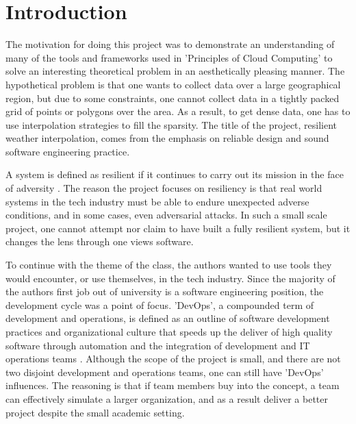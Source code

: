 \section{Introduction}
The motivation for doing this project was to demonstrate an understanding of many of the tools and frameworks used in 'Principles of Cloud Computing' to solve an interesting theoretical problem in an aesthetically pleasing manner.
The hypothetical problem is that one wants to collect data over a large geographical region,
but due to some constraints,
one cannot collect data in a tightly packed grid of points or polygons over the area.
As a result, to get dense data,
one has to use interpolation strategies to fill the sparsity.
The title of the project, resilient weather interpolation,
comes from the emphasis on reliable design and sound software engineering practice.

A system is defined as resilient if it continues to carry out its mission in the face of adversity \cite{systemResilience}.
The reason the project focuses on resiliency is that real world systems in the tech industry must be able to endure unexpected adverse conditions, 
and in some cases, even adversarial attacks. 
In such a small scale project, one cannot attempt nor claim to have built a fully resilient system,
but it changes the lens through one views software.

To continue with the theme of the class,
the authors wanted to use tools they would encounter, or use themselves,
in the tech industry. 
Since the majority of the authors first job out of university is a software engineering position,
the development cycle was a point of focus. 
'DevOps', a compounded term of development and operations,
is defined as an outline of software development practices and organizational culture that speeds up the deliver of high quality software through automation and the integration of development and IT operations teams \cite{devops}.
Although the scope of the project is small,
and there are not two disjoint development and operations teams, 
one can still have 'DevOps' influences. 
The reasoning is that if team members buy into the concept,
a team can effectively simulate a larger organization, 
and as a result deliver a better project despite the small academic setting. 